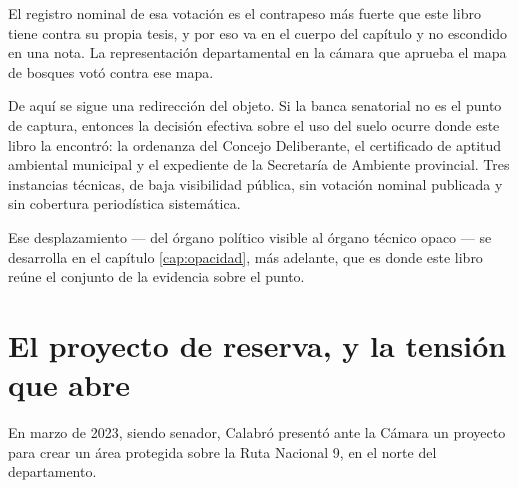El registro nominal de esa votación es el contrapeso más fuerte que este libro tiene contra su propia tesis, y por eso va en el cuerpo del capítulo y no escondido en una nota. La representación departamental en la cámara que aprueba el mapa de bosques votó contra ese mapa.

De aquí se sigue una redirección del objeto. Si la banca senatorial no es el punto de captura, entonces la decisión efectiva sobre el uso del suelo ocurre donde este libro la encontró: la ordenanza del Concejo Deliberante, el certificado de aptitud ambiental municipal y el expediente de la Secretaría de Ambiente provincial. Tres instancias técnicas, de baja visibilidad pública, sin votación nominal publicada y sin cobertura periodística sistemática.

Ese desplazamiento --- del órgano político visible al órgano técnico opaco --- se desarrolla en el capítulo \ref{cap:opacidad}, más adelante, que es donde este libro reúne el conjunto de la evidencia sobre el punto.

\section{El proyecto de reserva, y la tensión que abre}

En marzo de 2023, siendo senador, Calabró presentó ante la Cámara un proyecto para crear un área protegida sobre la Ruta Nacional 9, en el norte del departamento.

